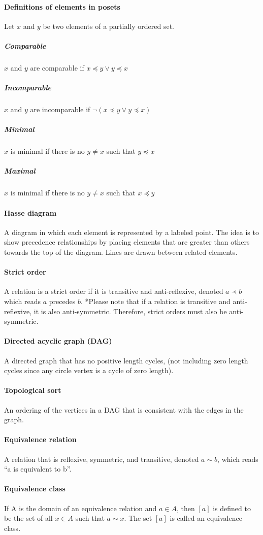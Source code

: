 \documentclass[a4paper]{article}
\begin{document}
\paragraph{Definitions of elements in posets} Let $x$ and $y$ be two elements of a partially ordered set.
\subparagraph{Comparable} $x$ and $y$ are comparable if $x \preceq y \lor y \preceq x$
\subparagraph{Incomparable} $x$ and $y$ are incomparable if $\lnot (x \preceq y \lor y \preceq x)$
\subparagraph{Minimal} $x$ is minimal if there is no $y \neq x$ such that $y \preceq x$
\subparagraph{Maximal} $x$ is minimal if there is no $y \neq x$ such that $x \preceq y$
\paragraph{Hasse diagram} A diagram in which each element is represented by a labeled point. The idea is to show precedence relationships by placing elements that are greater than others towards the top of the diagram. Lines are drawn between related elements.
\paragraph{Strict order} A relation is a strict order if it is transitive and anti-reflexive, denoted $a \prec b$ which reads $a$ precedes $b$. *Please note that if a relation is transitive and anti-reflexive, it is also anti-symmetric. Therefore, strict orders must also be anti-symmetric.
\paragraph{Directed acyclic graph (DAG)} A directed graph that has no positive length cycles, (not including zero length cycles since any circle vertex is a cycle of zero length).
\paragraph{Topological sort} An ordering of the vertices in a DAG that is consistent with the edges in the graph.
\paragraph{Equivalence relation} A relation that is reflexive, symmetric, and transitive, denoted $a \sim b$, which reads ``a is equivalent to b''.
\paragraph{Equivalence class} If A is the domain of an equivalence relation and $a \in A$, then $[a]$ is defined to be the set of all $x \in A$ such that $a \sim x$. The set $[a]$ is called an equivalence class.
\end{document}
